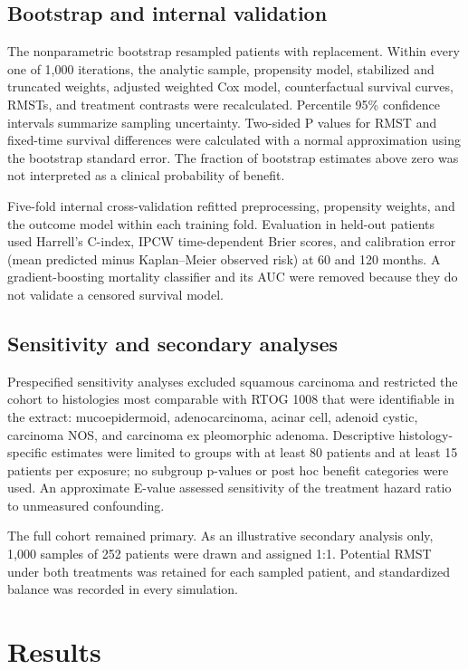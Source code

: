 \documentclass[9pt,twocolumn]{extarticle}
\begin{document}
\subsection{Bootstrap and internal validation}
The nonparametric bootstrap resampled patients with replacement. Within every one of 1,000 iterations, the analytic sample, propensity model, stabilized and truncated weights, adjusted weighted Cox model, counterfactual survival curves, RMSTs, and treatment contrasts were recalculated. Percentile 95\% confidence intervals summarize sampling uncertainty. Two-sided P values for RMST and fixed-time survival differences were calculated with a normal approximation using the bootstrap standard error. The fraction of bootstrap estimates above zero was not interpreted as a clinical probability of benefit.\par
Five-fold internal cross-validation refitted preprocessing, propensity weights, and the outcome model within each training fold. Evaluation in held-out patients used Harrell's C-index, IPCW time-dependent Brier scores, and calibration error (mean predicted minus Kaplan--Meier observed risk) at 60 and 120 months. A gradient-boosting mortality classifier and its AUC were removed because they do not validate a censored survival model.\par
\subsection{Sensitivity and secondary analyses}
Prespecified sensitivity analyses excluded squamous carcinoma and restricted the cohort to histologies most comparable with RTOG 1008 that were identifiable in the extract: mucoepidermoid, adenocarcinoma, acinar cell, adenoid cystic, carcinoma NOS, and carcinoma ex pleomorphic adenoma. Descriptive histology-specific estimates were limited to groups with at least 80 patients and at least 15 patients per exposure; no subgroup p-values or post hoc benefit categories were used. An approximate E-value assessed sensitivity of the treatment hazard ratio to unmeasured confounding.\par
The full cohort remained primary. As an illustrative secondary analysis only, 1,000 samples of 252 patients were drawn and assigned 1:1. Potential RMST under both treatments was retained for each sampled patient, and standardized balance was recorded in every simulation.\par
\section{Results}
\end{document}
